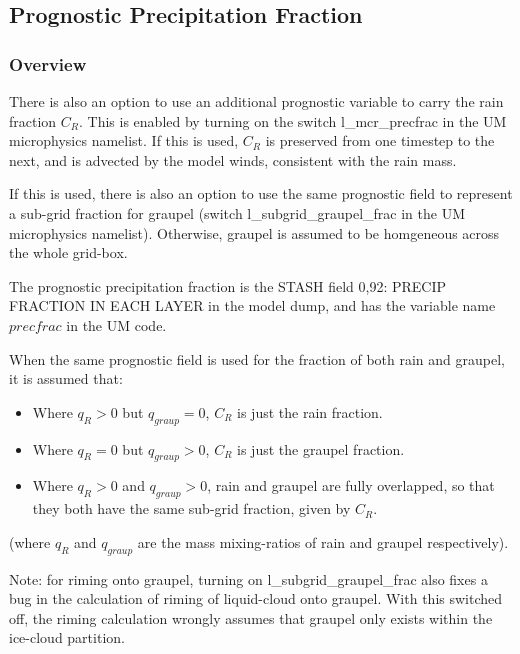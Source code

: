 \documentclass{UMDP_article}
\begin{document}
\subsection{Prognostic Precipitation Fraction}
\label{sec:prog_precip_frac}

\subsubsection{Overview}

There is also an option to use an additional prognostic variable
to carry the rain fraction $C_R$.  This is enabled by turning on the
switch l\_mcr\_precfrac in the UM microphysics namelist.
If this is used, $C_R$ is preserved from one timestep to the next,
and is advected by the model winds, consistent with the rain mass.

If this is used, there is also an option to use the same prognostic
field to represent a sub-grid fraction for graupel
(switch l\_subgrid\_graupel\_frac in the UM microphysics namelist).
Otherwise, graupel is assumed to be homgeneous across the whole grid-box.

The prognostic precipitation fraction is the STASH field
0,92: PRECIP FRACTION IN EACH LAYER
in the model dump, and has the variable name $precfrac$ in the UM code.

When the same prognostic field is used for the fraction of both rain and
graupel, it is assumed that:
\begin{itemize}
\item Where $q_R > 0$ but $q_{graup} = 0$, $C_R$ is just the rain fraction.
\item Where $q_R = 0$ but $q_{graup} > 0$, $C_R$ is just the graupel fraction.
\item Where $q_R > 0$ and $q_{graup} > 0$, rain and graupel are fully overlapped,
so that they both have the same sub-grid fraction, given by $C_R$.
\end{itemize}
(where $q_R$ and $q_{graup}$ are the mass mixing-ratios of rain and graupel
respectively).

Note: for riming onto graupel, turning on l\_subgrid\_graupel\_frac
also fixes a bug in the calculation of riming of liquid-cloud onto graupel.
With this switched off, the riming calculation wrongly assumes that
graupel only exists within the ice-cloud partition.
\end{document}
